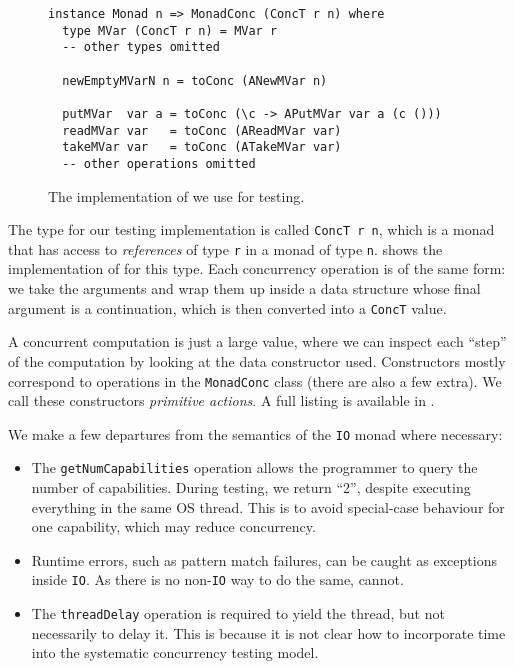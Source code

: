 \begin{figure}[t]
  \centering
  \begin{lstlisting}
instance Monad n => MonadConc (ConcT r n) where
  type MVar (ConcT r n) = MVar r
  -- other types omitted

  newEmptyMVarN n = toConc (ANewMVar n)

  putMVar  var a = toConc (\c -> APutMVar var a (c ()))
  readMVar var   = toConc (AReadMVar var)
  takeMVar var   = toConc (ATakeMVar var)
  -- other operations omitted
  \end{lstlisting}
  \caption{The implementation of  we use for testing.}
  \label{fig:mvarops}
\end{figure}

The type for our testing implementation is called \verb|ConcT r n|, which is a
monad that has access to \emph{references} of type \verb|r| in a monad of type
\verb|n|.   shows the implementation of  for
this type.  Each concurrency operation is of the same form: we take the
arguments and wrap them up inside a data structure whose final argument is a
continuation, which is then converted into a \verb|ConcT| value.

A concurrent computation is just a large value, where we can inspect each
``step'' of the computation by looking at the data constructor used.
Constructors mostly correspond to operations in the \verb|MonadConc| class
(there are also a few extra).  We call these constructors \emph{primitive
  actions}.  A full listing is available in .

We make a few departures from the semantics of the \verb|IO| monad where
necessary:

\begin{itemize}
\item The \verb|getNumCapabilities| operation allows the programmer to query the
  number of capabilities.  During testing, we return ``2'', despite executing
  everything in the same OS thread.  This is to avoid special-case behaviour for
  one capability, which may reduce concurrency.
\item Runtime errors, such as pattern match failures, can be caught as
  exceptions inside \verb|IO|.  As there is no non-\verb|IO| way to do the same,
  \dejafu{} cannot.
\item The \verb|threadDelay| operation is required to yield the thread, but not
  necessarily to delay it.  This is because it is not clear how to incorporate
  time into the systematic concurrency testing model.
\end{itemize}

